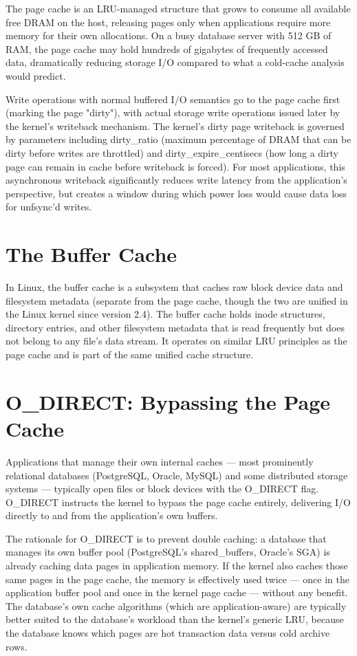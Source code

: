 The page cache is an LRU-managed structure that grows to consume all available free DRAM on the host, releasing pages only when applications require more memory for their own allocations. On a busy database server with 512 GB of RAM, the page cache may hold hundreds of gigabytes of frequently accessed data, dramatically reducing storage I/O compared to what a cold-cache analysis would predict.

Write operations with normal buffered I/O semantics go to the page cache first (marking the page "dirty"), with actual storage write operations issued later by the kernel's writeback mechanism. The kernel's dirty page writeback is governed by parameters including dirty\_ratio (maximum percentage of DRAM that can be dirty before writes are throttled) and dirty\_expire\_centisecs (how long a dirty page can remain in cache before writeback is forced). For most applications, this asynchronous writeback significantly reduces write latency from the application's perspective, but creates a window during which power loss would cause data loss for unfsync'd writes.

\section{The Buffer Cache}
In Linux, the buffer cache is a subsystem that caches raw block device data and filesystem metadata (separate from the page cache, though the two are unified in the Linux kernel since version 2.4). The buffer cache holds inode structures, directory entries, and other filesystem metadata that is read frequently but does not belong to any file's data stream. It operates on similar LRU principles as the page cache and is part of the same unified cache structure.

\section{O\_DIRECT: Bypassing the Page Cache}
Applications that manage their own internal caches --- most prominently relational databases (PostgreSQL, Oracle, MySQL) and some distributed storage systems --- typically open files or block devices with the O\_DIRECT flag. O\_DIRECT instructs the kernel to bypass the page cache entirely, delivering I/O directly to and from the application's own buffers.

The rationale for O\_DIRECT is to prevent double caching: a database that manages its own buffer pool (PostgreSQL's shared\_buffers, Oracle's SGA) is already caching data pages in application memory. If the kernel also caches those same pages in the page cache, the memory is effectively used twice --- once in the application buffer pool and once in the kernel page cache --- without any benefit. The database's own cache algorithms (which are application-aware) are typically better suited to the database's workload than the kernel's generic LRU, because the database knows which pages are hot transaction data versus cold archive rows.

